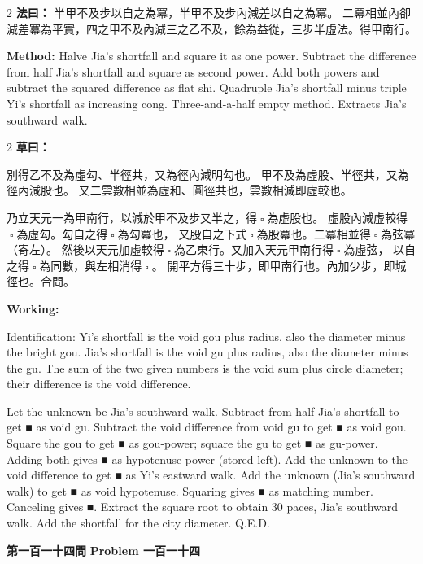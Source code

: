 \documentclass[11pt,a4paper]{article}
\let\origsquare\square
\renewcommand{\square}{\ensuremath{\origsquare}}%
\newcommand{\wen}[1]{%
  \par\vspace{0.5em}%
  \noindent\textcolor{problemcolor}{\textbf{第#1問}}%
  \hfill\textcolor{problemcolor}{\textbf{Problem #1}}\par\nopagebreak%
  \vspace{0.3em}%
}
\newcommand{\fayue}[1]{%
  \noindent\textcolor{methodcolor}{\textbf{法曰：}}{\tradfont #1}\par\nopagebreak%
}
\newcommand{\fayueeng}[1]{%
  \noindent\textcolor{engcolor}{\textbf{Method: }}{#1}\par\nopagebreak%
}
\newcommand{\tsaoyue}[1]{%
  \noindent\textcolor{workcolor}{\textbf{草曰：}}{\tradfont #1}\par%
}
\newcommand{\tsaoyueeng}[1]{%
  \noindent\textcolor{engcolor}{\textbf{Working: }}{\small #1}\par%
}
\begin{document}
\begin{paracol}{2}
\fayue{%
半甲不及步以自之為冪，半甲不及步內減差以自之為冪。
二冪相並內卻減差冪為平實，四之甲不及內減三之乙不及，餘為益從，三步半虛法。得甲南行。}
\switchcolumn
\fayueeng{%
Halve Jia's shortfall and square it as one power. Subtract the difference from half Jia's shortfall and square as second power. Add both powers and subtract the squared difference as flat shi. Quadruple Jia's shortfall minus triple Yi's shortfall as increasing cong. Three-and-a-half empty method. Extracts Jia's southward walk.}
\end{paracol}

\begin{paracol}{2}
\tsaoyue{%
別得乙不及為虛勾、半徑共，又為徑內減明勾也。
甲不及為虛股、半徑共，又為徑內減股也。
又二雲數相並為虛和、圓徑共也，雲數相減即虛較也。

乃立天元一為甲南行，以減於甲不及步又半之，得$ \; \square \; $為虛股也。
虛股內減虛較得$ \; \square \; $為虛勾。勾自之得$ \; \square \; $為勾冪也，
又股自之下式$ \; \square \; $為股冪也。二冪相並得$ \; \square \; $為弦冪（寄左）。
然後以天元加虛較得$ \; \square \; $為乙東行。又加入天元甲南行得$ \; \square \; $為虛弦，
以自之得$ \; \square \; $為同數，與左相消得$ \; \square \; $。
開平方得三十步，即甲南行也。內加少步，即城徑也。合問。}
\switchcolumn
\tsaoyueeng{%
Identification: Yi's shortfall is the void gou plus radius, also the diameter minus the bright gou. Jia's shortfall is the void gu plus radius, also the diameter minus the gu. The sum of the two given numbers is the void sum plus circle diameter; their difference is the void difference.

Let the unknown be Jia's southward walk. Subtract from half Jia's shortfall to get ■ as void gu. Subtract the void difference from void gu to get ■ as void gou. Square the gou to get ■ as gou-power; square the gu to get ■ as gu-power. Adding both gives ■ as hypotenuse-power (stored left). Add the unknown to the void difference to get ■ as Yi's eastward walk. Add the unknown (Jia's southward walk) to get ■ as void hypotenuse. Squaring gives ■ as matching number. Canceling gives ■. Extract the square root to obtain 30 paces, Jia's southward walk. Add the shortfall for the city diameter. Q.E.D.}
\end{paracol}

\vspace{0.5cm}

\wen{一百一十四}
\end{document}
